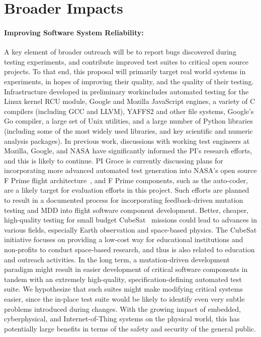 \section{Broader Impacts}

\paragraph{Improving Software System Reliability:} A key element of
broader outreach will be to report bugs discovered during testing
experiments, and contribute improved test suites to critical open
source projects.  To that end, this proposal will primarily target real world
systems in experiments, in hopes of improving their quality, and
the quality of their testing.  Infrastructure developed in preliminary
workincludes automated testing for
the Linux kernel RCU module, Google and Mozilla JavaScript engines, a
variety of C compilers (including GCC and LLVM), YAFFS2 \cite{yaffs2}
and other file systems, Google's Go compiler, a large set of Unix
utilities, and a large number of Python libraries (including some of
the most widely used libraries, and key scientific and numeric
analysis packages).  In previous work, discussions with working test
engineers at Mozilla, Google, and NASA have significantly informed the PI's
research efforts, and this is likely to continue.  PI Groce is
currently discussing plans for incorporating more advanced automated
test generation into NASA's open source F Prime flight
architecture~\cite{fprime,fprimerepo}, 
and F Prime components, such as the auto-coder, are a likely target
for evaluation efforts in this project.  Such efforts are planned to
result in a documented process for incorporating feedback-driven
mutation testing and MDD into flight software component development.
Better, cheaper, high-quality testing for small budget CubeSat~\cite{CubeSat}
missions could lead to advances in various fields, especially Earth
observation and space-based physics.  The CubeSat initiative focuses on providing a
low-cost way for educational institutions and non-profits to conduct space-based
research, and thus is also related to education and outreach
activities.
In the long term,
a mutation-driven development paradigm might result in
easier development of critical software components in tandem with an
extremely high-quality, specification-defining automated test suite.
We hypothesize that such suites might make modifying critical systems
easier, since the in-place test suite would be likely to identify even
very subtle problems introduced during changes.  With the growing
impact of embedded, cyberphysical, and Internet-of-Thing systems on
the physical world, this has potentially large benefits in terms of the safety and security
of the general public.

